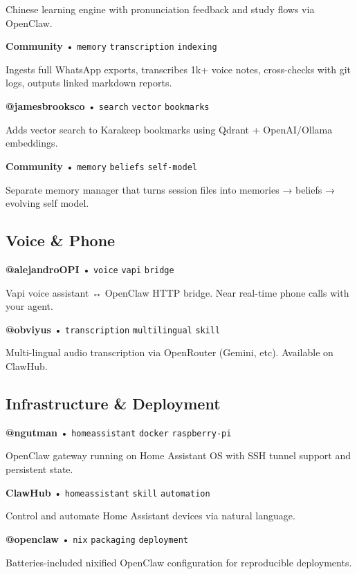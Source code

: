 Chinese learning engine with pronunciation feedback and study flows via OpenClaw.


\textbf{Community} • \texttt{memory} \texttt{transcription} \texttt{indexing}

Ingests full WhatsApp exports, transcribes 1k+ voice notes, cross-checks with git logs, outputs linked markdown reports.

\textbf{@jamesbrooksco} • \texttt{search} \texttt{vector} \texttt{bookmarks}

Adds vector search to Karakeep bookmarks using Qdrant + OpenAI/Ollama embeddings.

\textbf{Community} • \texttt{memory} \texttt{beliefs} \texttt{self-model}

Separate memory manager that turns session files into memories → beliefs → evolving self model.


\subsection{Voice \& Phone}



\textbf{@alejandroOPI} • \texttt{voice} \texttt{vapi} \texttt{bridge}

Vapi voice assistant ↔ OpenClaw HTTP bridge. Near real-time phone calls with your agent.

\textbf{@obviyus} • \texttt{transcription} \texttt{multilingual} \texttt{skill}

Multi-lingual audio transcription via OpenRouter (Gemini, etc). Available on ClawHub.


\subsection{Infrastructure \& Deployment}



\textbf{@ngutman} • \texttt{homeassistant} \texttt{docker} \texttt{raspberry-pi}

OpenClaw gateway running on Home Assistant OS with SSH tunnel support and persistent state.

\textbf{ClawHub} • \texttt{homeassistant} \texttt{skill} \texttt{automation}

Control and automate Home Assistant devices via natural language.

\textbf{@openclaw} • \texttt{nix} \texttt{packaging} \texttt{deployment}

Batteries-included nixified OpenClaw configuration for reproducible deployments.

